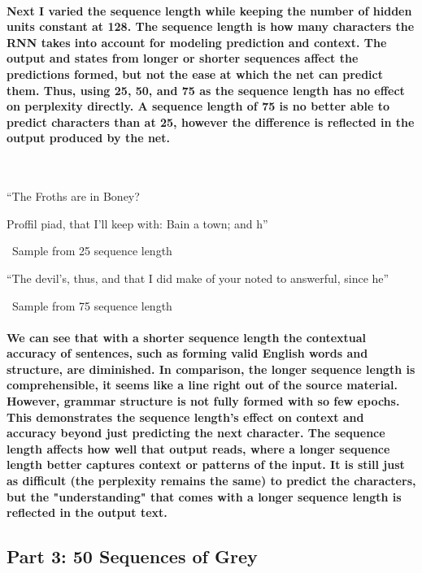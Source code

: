 \documentclass[10pt,a4paper]{report}
\begin{document}
\paragraph{
Next I varied the sequence length while keeping the number of hidden units constant at 128. The sequence length is how many characters the RNN takes into account for modeling prediction and context. The output and states from longer or shorter sequences affect the predictions formed, but not the ease at which the net can predict them. Thus, using 25, 50, and 75 as the sequence length has no effect on perplexity directly. A sequence length of 75 is no better able to predict characters than at 25, however the difference is reflected in the output produced by the net.
}

\
\vspace{5mm}

``The Froths are in Boney?

Proffil
piad, that I'll keep with:
Bain a town; and h''

\ 
Sample from 25 sequence length
\vspace{5mm}

``The devil's, thus, and that I did make of your noted to answerful, since he''

\ 
Sample from 75 sequence length
\

\paragraph{
We can see that with a shorter sequence length the contextual accuracy of sentences, such as forming valid English words and structure, are diminished. In comparison, the longer sequence length is comprehensible, it seems like a line right out of the source material. However, grammar structure is not fully formed with so few epochs. This demonstrates the sequence length's effect on context and accuracy beyond just predicting the next character. The sequence length affects how well that output reads, where a longer sequence length better captures context or patterns of the input. It is still just as difficult (the perplexity remains the same) to predict the characters, but the "understanding" that comes with a longer sequence length is reflected in the output text.
}

\clearpage

\subsection{Part 3: 50 Sequences of Grey}
\end{document}

